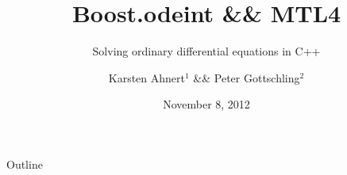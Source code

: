\documentclass{beamer}
\title[Boost.odeint]{Boost.odeint \&\& MTL4}
\subtitle[odeint]{Solving ordinary differential equations in C++}
\author[Karsten Ahnert]{Karsten Ahnert$^1$ \&\& Peter Gottschling$^2$}
\institute[Ambrosys GmbH]{$^1$Ambrosys -- Gesellschaft f\"ur Management komplexer Systeme, Potsdam \vspace{1ex} \newline
 $^2$ SimuNova, Dresden}
\date{November 8, 2012}
\newcommand{\heading}[1]{\centerline{\Large #1} \vspace{0.5em}}
\begin{document}
\frame{
  \titlepage


}

\begin{frame}
  \heading{Outline}

  \tableofcontents
\end{frame}








% 

% 

% 


%
\end{document}
